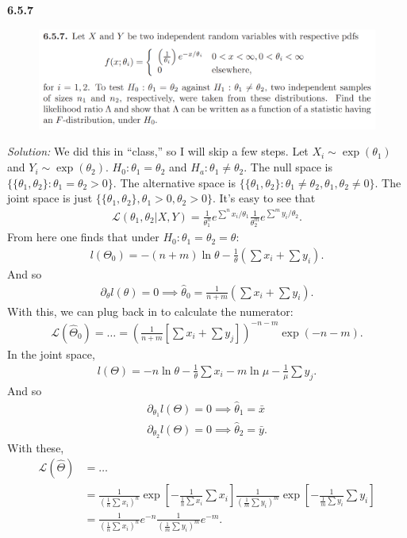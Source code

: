 \documentclass{book}
\theoremstyle{definition}
\newcommand{\p}{\partial}
\newcommand{\lag}{\mathcal{L}}
\newcommand{\f}[2]{\frac{#1}{#2}}
\newcommand{\lp}{\left(}
\newcommand{\rp}{\right)}
\newcommand{\lb}{\left[}
\newcommand{\rb}{\right]}
\begin{document}
\newpage
\noindent \textbf{6.5.7}
\begin{figure}[!htb]
	\centering
	\includegraphics[scale=0.6]{657}
\end{figure}


\noindent \textit{Solution:} We did this in ``class,'' so I will skip a few steps. Let $X_i \sim \exp (\theta_1)$ and $Y_i \sim \exp(\theta_2)$. $H_0 : \theta_1 = \theta_2$ and $H_a : \theta_1 \neq \theta_2$. The null space is $\{ \{ \theta_1,\theta_2\}: \theta_1 = \theta_2 > 0 \}$. The alternative space is $\{ \{ \theta_1,\theta_2 \}: \theta_1 \neq \theta_2, \theta_1,\theta_2 \neq 0 \}$. The joint space is just $\{ \{ \theta_1,\theta_2 \}, \theta_1 >0, \theta_2 > 0 \}$. It's easy to see that
\begin{align}
\lag(\theta_1,\theta_2 \vert X,Y) = \f{1}{\theta_1^n}e^{\sum^n x_i/\theta_1} \f{1}{\theta_2^m}e^{\sum^m y_i/\theta_2} .
\end{align}
From here one finds that under $H_0: \theta_1 = \theta_2 = \theta$:
\begin{align}
l(\Theta_0) = -(n+m) \ln\theta-\f{1}{\theta}\lp \sum x_i + \sum y_i \rp.
\end{align}
And so
\begin{align}
\p_\theta l(\theta) = 0 \implies \hat\theta_0 = \f{1}{n+m} \lp \sum x_i + \sum y_i \rp.
\end{align}
With this, we can plug back in to calculate the numerator:
\begin{align}
\lag(\hat\Theta_0) = \dots = \lp\f{1}{n+m} \lb\sum x_i + \sum y_j \rb \rp^{-n-m} \exp(-n-m).
\end{align}
In the joint space, 
\begin{align}
l(\Theta) = -n \ln \theta - \f{1}{\theta}\sum x_i - m \ln \mu - \f{1}{\mu}\sum y_j.
\end{align}
And so
\begin{align}
\p_{\theta_1} l(\Theta) = 0 \implies \hat\theta_1 = \bar{x}\\
\p_{\theta_2} l(\Theta) = 0 \implies \hat\theta_2 =  \bar{y}.
\end{align}
With these,
\begin{align}
\lag(\hat\Theta) &= \dots\\
&= \f{1}{\lp \f{1}{n}\sum x_i \rp^n} \exp \lb -\f{1}{\f{1}{n}\sum x_i} \sum x_i\rb  
\f{1}{\lp \f{1}{m}\sum y_i \rp^m} \exp \lb -\f{1}{\f{1}{m}\sum y_i} \sum y_i\rb\\
&=\f{1}{\lp \f{1}{n}\sum x_i \rp^n} e^{-n} \f{1}{\lp \f{1}{m}\sum y_i \rp^m} e^{-m}.
\end{align}
\end{document}
